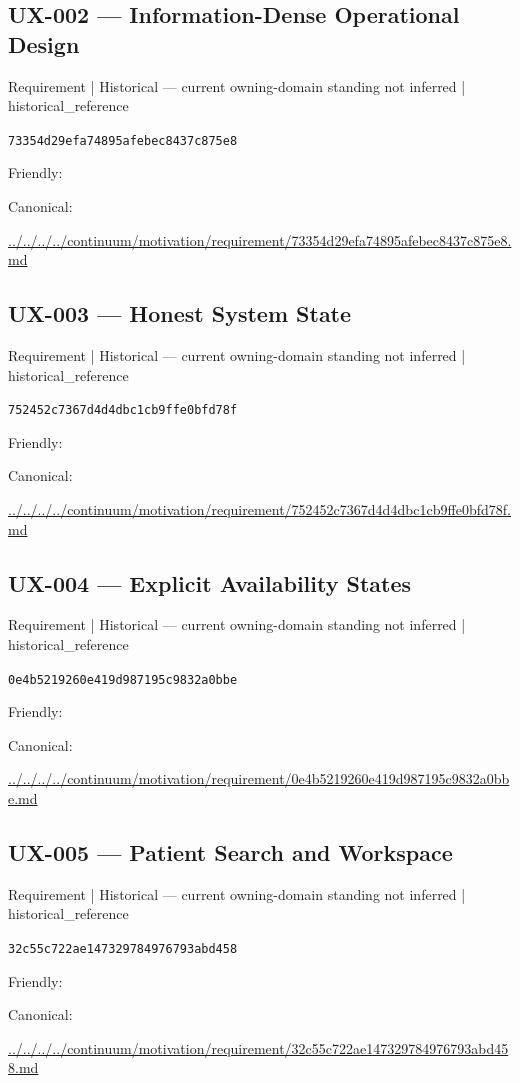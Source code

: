 \documentclass[10pt,a4paper]{article}
\begin{document}
\subsection*{UX-002 — Information-Dense Operational Design}
{\small Requirement | Historical — current owning-domain standing not inferred | historical\_reference}\par
\texttt{73354d29efa74895afebec8437c875e8}\par
Friendly: \par
Canonical: \par
{\footnotesize\url{../../../../continuum/motivation/requirement/73354d29efa74895afebec8437c875e8.md}}\par
\subsection*{UX-003 — Honest System State}
{\small Requirement | Historical — current owning-domain standing not inferred | historical\_reference}\par
\texttt{752452c7367d4d4dbc1cb9ffe0bfd78f}\par
Friendly: \par
Canonical: \par
{\footnotesize\url{../../../../continuum/motivation/requirement/752452c7367d4d4dbc1cb9ffe0bfd78f.md}}\par
\subsection*{UX-004 — Explicit Availability States}
{\small Requirement | Historical — current owning-domain standing not inferred | historical\_reference}\par
\texttt{0e4b5219260e419d987195c9832a0bbe}\par
Friendly: \par
Canonical: \par
{\footnotesize\url{../../../../continuum/motivation/requirement/0e4b5219260e419d987195c9832a0bbe.md}}\par
\subsection*{UX-005 — Patient Search and Workspace}
{\small Requirement | Historical — current owning-domain standing not inferred | historical\_reference}\par
\texttt{32c55c722ae147329784976793abd458}\par
Friendly: \par
Canonical: \par
{\footnotesize\url{../../../../continuum/motivation/requirement/32c55c722ae147329784976793abd458.md}}\par
\end{document}
